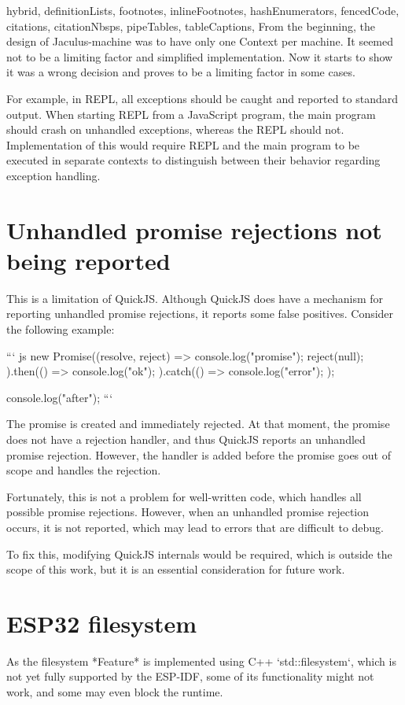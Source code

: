 \documentclass[
  digital,
  oneside,
  nosansbold,
  nocolorbold,
  lof,
  lot
]{fithesis4}
\begin{document}
\begin{markdown*}{%
  hybrid,
  definitionLists,
  footnotes,
  inlineFootnotes,
  hashEnumerators,
  fencedCode,
  citations,
  citationNbsps,
  pipeTables,
  tableCaptions,
}
From the beginning, the design of Jaculus-machine was to have only one Context per machine. It seemed not to be a limiting factor and simplified implementation. Now it starts to show it was a wrong decision and proves to be a limiting factor in some cases.

For example, in REPL, all exceptions should be caught and reported to standard output. When starting REPL from a JavaScript program, the main program should crash on unhandled exceptions, whereas the REPL should not. Implementation of this would require REPL and the main program to be executed in separate contexts to distinguish between their behavior regarding exception handling.


\section{Unhandled promise rejections not being reported}

This is a limitation of QuickJS. Although QuickJS does have a mechanism for reporting unhandled promise rejections, it reports some false positives. Consider the following example:

``` js
new Promise((resolve, reject) => {
    console.log("promise");
    reject(null);
}).then(() => {
    console.log("ok");
}).catch(() => {
    console.log("error");
});

console.log("after");
```

The promise is created and immediately rejected. At that moment, the promise does not have a rejection handler, and thus QuickJS reports an unhandled promise rejection. However, the handler is added before the promise goes out of scope and handles the rejection.

Fortunately, this is not a problem for well-written code, which handles all possible promise rejections. However, when an unhandled promise rejection occurs, it is not reported, which may lead to errors that are difficult to debug.

To fix this, modifying QuickJS internals would be required, which is outside the scope of this work, but it is an essential consideration for future work.


\section{ESP32 filesystem}

As the filesystem *Feature* is implemented using C++ `std::filesystem`, which is not yet fully supported by the ESP-IDF, some of its functionality might not work, and some may even block the runtime.


\end{markdown*}
\end{document}
